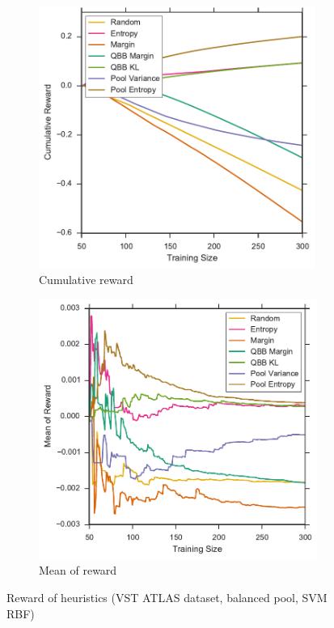 \begin{figure}[p]
	\centering
	\begin{subfigure}{.5\textwidth}
		\centering
		\includegraphics[width=0.99\textwidth]{figures/5_thompson/vstatlas_br_sum_rewards}
		\caption{Cumulative reward}
		\label{fig:vstatlas_br_sum_rewards}
	\end{subfigure}%
	\begin{subfigure}{.5\textwidth}
		\centering
		\includegraphics[width=0.99\linewidth]{figures/5_thompson/vstatlas_br_avg_rewards}
		\caption{Mean of reward}
		\label{fig:vstatlas_br_avg_rewards}
	\end{subfigure}
	\caption[Reward of heuristics (VST ATLAS, balanced, SVM RBF)]{
		Reward of heuristics (VST ATLAS dataset, balanced pool, SVM RBF)}
	\label{fig:vstatlas_br_rewards}
\end{figure}


